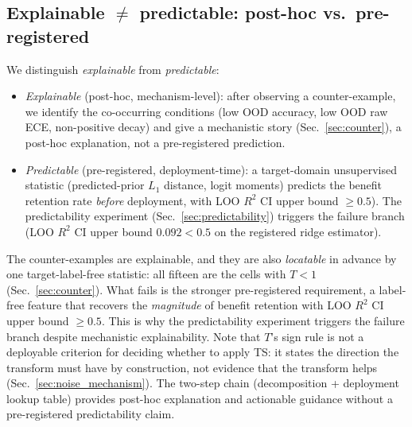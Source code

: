 \documentclass[final,5p,times,nonatbib]{elsarticle}
\begin{document}
\subsection{Explainable $\neq$ predictable: post-hoc vs.\ pre-registered}
We distinguish \emph{explainable} from \emph{predictable}:
\begin{itemize}
    \item \emph{Explainable} (post-hoc, mechanism-level): after
    observing a counter-example, we identify the co-occurring
    conditions (low OOD accuracy, low OOD raw ECE, non-positive
    decay) and give a mechanistic story (Sec.~\ref{sec:counter}), a
    post-hoc explanation, not a pre-registered prediction.
    \item \emph{Predictable} (pre-registered, deployment-time): a
    target-domain unsupervised statistic (predicted-prior $L_1$
    distance, logit moments) predicts the benefit retention rate
    \emph{before} deployment, with LOO $R^2$ CI upper bound
    $\geq 0.5$). The predictability experiment
    (Sec.~\ref{sec:predictability}) triggers the failure branch
    (LOO $R^2$ CI upper bound $0.092 < 0.5$ on the registered ridge
    estimator).
\end{itemize}
The counter-examples are explainable, and they are also \emph{locatable}
in advance by one target-label-free statistic: all fifteen are the cells
with $T<1$ (Sec.~\ref{sec:counter}). What fails is the stronger
pre-registered requirement, a label-free feature that recovers the
\emph{magnitude} of benefit retention with LOO $R^2$ CI upper bound
$\geq 0.5$. This is why the predictability experiment triggers the
failure branch despite mechanistic explainability. Note that $T$'s sign
rule is not a deployable criterion for deciding whether to apply TS: it
states the direction the transform must have by construction, not
evidence that the transform helps (Sec.~\ref{sec:noise_mechanism}). The
two-step chain (decomposition + deployment
lookup table) provides post-hoc explanation and actionable guidance
without a pre-registered predictability claim.

\end{document}
